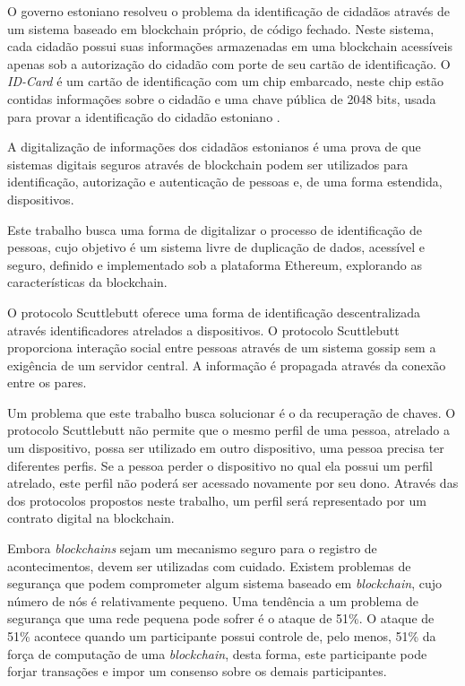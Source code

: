 \documentclass[tcc,capa]{texufpel}
\begin{document}
    O governo estoniano resolveu o problema da identificação de cidadãos através de um sistema baseado em blockchain próprio, de código fechado. Neste sistema, cada cidadão possui suas informações armazenadas em uma blockchain acessíveis apenas sob a autorização do cidadão com porte de seu cartão de identificação. O \textit{ID-Card} é um cartão de identificação com um chip embarcado, neste chip estão contidas informações sobre o cidadão e uma chave pública de 2048 bits, usada para provar a identificação do cidadão estoniano \cite{eidentity}.
    
    A digitalização de informações dos cidadãos estonianos é uma prova de que sistemas digitais seguros através de blockchain podem ser utilizados para identificação, autorização e autenticação de pessoas e, de uma forma estendida, dispositivos.
    
    Este trabalho busca uma forma de digitalizar o processo de identificação de pessoas, cujo objetivo é um sistema livre de duplicação de dados, acessível e seguro, definido e implementado sob a plataforma Ethereum, explorando as características da blockchain.
    
    O protocolo Scuttlebutt \cite{vanRenesse:2008:ERF:1529974.1529983} oferece uma forma de identificação descentralizada através identificadores atrelados a dispositivos. O protocolo Scuttlebutt proporciona interação social entre pessoas através de um sistema gossip sem a exigência de um servidor central. A informação é propagada através da conexão entre os pares.
    
    Um problema que este trabalho busca solucionar é o da recuperação de chaves. O protocolo Scuttlebutt não permite que o mesmo perfil de uma pessoa, atrelado a um dispositivo, possa ser utilizado em outro dispositivo, uma pessoa precisa ter diferentes perfis. Se a pessoa perder o dispositivo no qual ela possui um perfil atrelado, este perfil não poderá ser acessado novamente por seu dono. Através das dos protocolos propostos neste trabalho, um perfil será representado por um contrato digital na blockchain.
    
    Embora \textit{blockchains} sejam um mecanismo seguro para o registro de acontecimentos, devem ser utilizadas com cuidado. Existem problemas de segurança que podem comprometer algum sistema baseado em \textit{blockchain}, cujo número de nós é relativamente pequeno. Uma tendência a um problema de segurança que uma rede pequena pode sofrer é o ataque de 51\%. O ataque de 51\% acontece quando um participante possui controle de, pelo menos, 51\% da força de computação de uma \textit{blockchain}, desta forma, este participante pode forjar transações e impor um consenso sobre os demais participantes.
    
\end{document}
